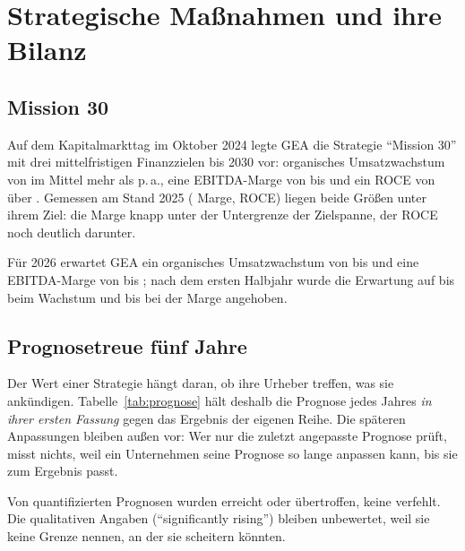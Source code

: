\section{Strategische Ma{\ss}nahmen und ihre Bilanz}
\label{sec:strategie}

\subsection{Mission 30}

Auf dem Kapitalmarkttag im Oktober 2024 legte GEA die Strategie \enquote{Mission 30} mit
drei mittelfristigen Finanzzielen bis 2030 vor: organisches Umsatzwachstum von im Mittel
mehr als \Pz{\MissionWachstum} p.\,a., eine EBITDA-Marge von \Pz{\MissionMargeVon} bis
\Pz{\MissionMargeBis} und ein ROCE von \"uber \Pz{\MissionRoce}. Gemessen am
Stand 2025 (\Pz{\EbitdaMarge} Marge, \Pz{\Roce} ROCE) liegen beide Gr\"o{\ss}en unter
ihrem Ziel: die Marge knapp unter der Untergrenze der Zielspanne, der ROCE noch deutlich
darunter.

F\"ur 2026 erwartet GEA ein organisches Umsatzwachstum von \Pz{\PrognoseWachstumVon} bis
\Pz{\PrognoseWachstumBis} und eine EBITDA-Marge von \Pz{\PrognoseMargeVon} bis
\Pz{\PrognoseMargeBis}; nach dem ersten Halbjahr wurde die Erwartung auf
\Pz{\HjWachstumVon} bis \Pz{\HjWachstumBis} beim Wachstum und \Pz{\HjMargeVon} bis
\Pz{\HjMargeBis} bei der Marge angehoben.

\subsection{Prognosetreue f\"unf Jahre}

Der Wert einer Strategie h\"angt daran, ob ihre Urheber treffen, was sie ank\"undigen.
Tabelle~\ref{tab:prognose} h\"alt deshalb die Prognose jedes Jahres \emph{in ihrer ersten
Fassung} gegen das Ergebnis der eigenen Reihe. Die sp\"ateren Anpassungen bleiben
au{\ss}en vor: Wer nur die zuletzt angepasste Prognose pr\"uft, misst nichts, weil ein
Unternehmen seine Prognose so lange anpassen kann, bis sie zum Ergebnis passt.

\prognosetabelle

Von \PrognoseQuantifiziert{} quantifizierten Prognosen wurden
\PrognoseTreffer{} erreicht oder \"ubertroffen, keine verfehlt. Die qualitativen Angaben
(\enquote{significantly rising}) bleiben unbewertet, weil sie keine Grenze nennen, an der
sie scheitern k\"onnten.


